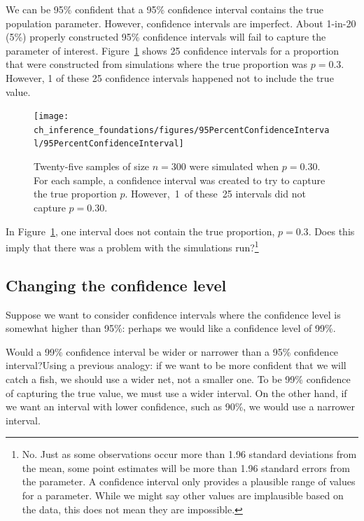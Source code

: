 We can be 95\% confident that a 95\% confidence interval contains the true population parameter. However, confidence intervals are imperfect. About 1-in-20 (5\%) properly constructed 95\% confidence intervals will fail to capture the parameter of interest. Figure~\ref{95PercentConfidenceInterval} shows 25 confidence intervals for a proportion that were constructed from simulations where the true proportion was $p = 0.3$. However, 1 of these 25 confidence intervals happened not to include the true value.

\begin{figure}[hht]
\centering
\texttt{[image: ch\_inference\_foundations/figures/95PercentConfidenceInterval/95PercentConfidenceInterval]}
\caption{Twenty-five samples of size $n=300$ were simulated when $p = 0.30$. For each sample, a confidence interval was created to try to capture the true proportion $p$. However,~1~of these~25 intervals did not capture $p = 0.30$.}
\label{95PercentConfidenceInterval}
\end{figure}

\begin{exercise}
In Figure~\ref{95PercentConfidenceInterval}, one interval does not contain the true proportion, $p = 0.3$. Does this imply that there was a problem with the simulations run?\footnote{No. Just as some observations occur more than 1.96 standard deviations from the mean, some point estimates will be more than 1.96 standard errors from the parameter. A confidence interval only provides a plausible range of values for a parameter. While we might say other values are implausible based on the data, this does not mean they are impossible.}
\end{exercise}


\subsection{Changing the confidence level}
\label{changingTheConfidenceLevelSection}


Suppose we want to consider confidence intervals where the confidence level is somewhat higher than 95\%: perhaps we would like a confidence level of 99\%. 

\begin{example}{Would a 99\% confidence interval be wider or narrower than a 95\% confidence interval?}Using a previous analogy: if we want to be more confident that we will catch a fish, we should use a wider net, not a smaller one. To be 99\% confidence of capturing the true value, we must use a wider interval. On the other hand, if we want an interval with lower confidence, such as 90\%, we would use a narrower interval.
\end{example}

